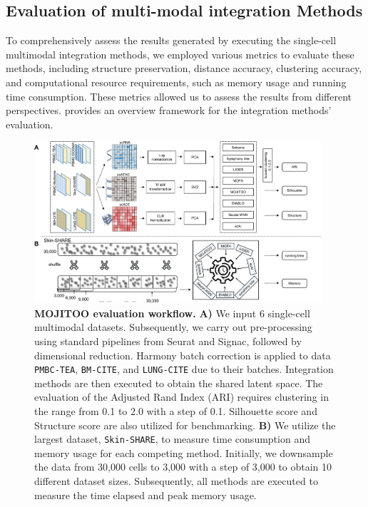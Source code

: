 \subsection{Evaluation of multi-modal integration Methods}
\label{MOJITOO:exp:metrics}

To comprehensively assess the results generated by executing the single-cell multimodal integration methods, we employed various metrics to evaluate these methods, including structure preservation, distance accuracy, clustering accuracy, and computational resource requirements, such as memory usage and running time consumption. These metrics allowed us to assess the results from different perspectives.  provides an overview framework for the integration methods' evaluation.
\begin{figure}[!ht]
	\centering
	\includegraphics[width=0.95\textwidth]{evaluation_MOJITOO/fig}
	\vspace{0.1cm}
	\caption[MOJITOO evaluation workflow]{
	\textbf{MOJITOO evaluation workflow.} \textbf{A)} We input 6 single-cell multimodal datasets. Subsequently, we carry out pre-processing using standard pipelines from Seurat and Signac, followed by dimensional reduction. Harmony batch correction is applied to data \texttt{PMBC-TEA}, \texttt{BM-CITE}, and \texttt{LUNG-CITE} due to their batches. Integration methods are then executed to obtain the shared latent space. The evaluation of the Adjusted Rand Index (ARI) requires clustering in the range from 0.1 to 2.0 with a step of 0.1. Silhouette score and Structure score are also utilized for benchmarking. \textbf{B)} We utilize the largest dataset, \texttt{Skin-SHARE}, to measure time consumption and memory usage for each competing method. Initially, we downsample the data from 30,000 cells to 3,000 with a step of 3,000 to obtain 10 different dataset sizes. Subsequently, all methods are executed to measure the time elapsed and peak memory usage.}
	\label{fig:evaluation_MOJITOO}
\end{figure}

